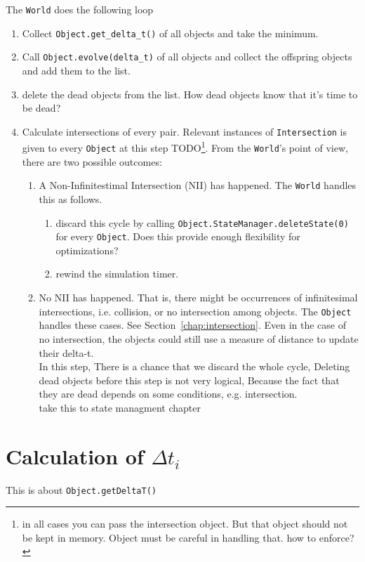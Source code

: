 \documentclass[a4paper]{report}
\newcommand{\cm}[1]{{\color{red}#1}}
\newcommand{\ai}[1]{{\color{blue}#1}}
\begin{document}
The \verb+World+ does the following loop
\begin{enumerate}
	\item Collect \verb+Object.get_delta_t()+ of all objects and take the minimum.
	\item Call \verb+Object.evolve(delta_t)+ of all objects and collect the offspring objects and add them to the list.
	\item delete the dead objects from the list.
	\cm{How dead objects know that it's time to be dead?}
	\item Calculate intersections of every pair. Relevant instances of \verb+Intersection+ is given to every \verb+Object+ at this step TODO\footnote{\ai{in all cases you can pass the intersection object. But that object should not be kept in memory. Object must be careful in handling that. how to enforce?}}. From the \verb+World+'s point of view, there are two possible outcomes:
	\begin{enumerate}
		\item A Non-Infinitestimal Intersection (NII) has happened. The \verb+World+ handles this as follows. 
		\begin{enumerate}
			\item discard this cycle by calling \verb+Object.StateManager.deleteState(0)+ for every \verb+Object+. \cm{Does this provide enough flexibility for optimizations?}
			\item rewind the simulation timer.
		\end{enumerate}
		\item No NII has happened. That is, there might be occurrences of infinitesimal intersections, i.e. collision, or no intersection among objects. The \verb+Object+ handles these cases. See Section~\ref{chap:intersection}. \cm{Even in the case of no intersection, the objects could still use a measure of distance to update their delta-t.}\\
		\cm{In this step, There is a chance that we discard the whole cycle, Deleting dead objects before this step is not very logical, Because the fact that they are dead depends on some conditions, e.g. intersection. }\\ \ai{take this to state managment chapter}
		
	\end{enumerate}
\end{enumerate}

\section{Calculation of $\Delta t_i$}
This is about \verb+Object.getDeltaT()+
\end{document}
